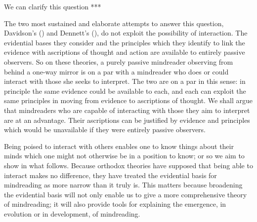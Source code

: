 \documentclass[12pt,a4paper]{extarticle}
\begin{document}
We can clarify this question ***



The two most sustained and elaborate attempts to answer this question,
Davidson's (\citeyear{Davidson:1984wh}) and Dennett's (\citeyear{Dennett:1987sf}),
do not exploit the possibility of interaction.
The evidential bases they consider and the principles which they identify to link the evidence with ascriptions of thought and action are available to entirely passive observers.
So on these theories,
a purely passive mindreader observing from behind a one-way mirror
is on a par with
a mindreader who does or could interact with those she seeks to interpret.
The two are on a par in this sense:
in principle the same evidence could be available to each, and each can exploit the same principles in moving from evidence to ascriptions of thought.
We shall argue that mindreaders who are capable of interacting with those they aim to interpret are at an advantage.
Their ascriptions can be justified by evidence and principles which would be unavailable if they were entirely passive observers.

Being poised to interact with others enables one to know things about their minds which one might not otherwise be in a position to know; or so we aim to show in what follows.
Because orthodox theories have supposed that being able to interact makes no difference,
they have treated the evidential basis for mindreading as more narrow than it truly is.
This matters because broadening the evidential basis will not only enable us to give a more comprehensive theory of mindreading; 
it will also provide tools for explaining the emergence, in evolution or in development, of mindreading.
\end{document}
